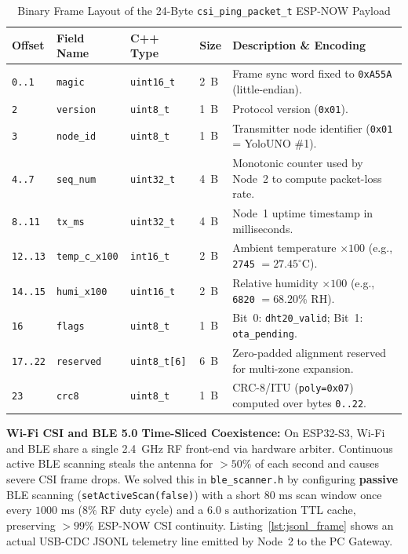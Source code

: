 \documentclass{hcmut-report}
\begin{document}
\begin{table}[H]
\centering
\caption{Binary Frame Layout of the 24-Byte \texttt{csi\_ping\_packet\_t} ESP-NOW Payload}
\label{tab:packet_layout}
\footnotesize
\begin{tabularx}{\textwidth}{|C{1.5cm}|P{2.8cm}|P{2.2cm}|C{1.3cm}|Y|}
\hline
\textbf{Offset} & \textbf{Field Name} & \textbf{C++ Type} & \textbf{Size} & \textbf{Description \& Encoding} \\
\hline
\texttt{0..1} & \texttt{magic} & \texttt{uint16\_t} & 2~B & Frame sync word fixed to \texttt{0xA55A} (little-endian). \\
\hline
\texttt{2} & \texttt{version} & \texttt{uint8\_t} & 1~B & Protocol version (\texttt{0x01}). \\
\hline
\texttt{3} & \texttt{node\_id} & \texttt{uint8\_t} & 1~B & Transmitter node identifier (\texttt{0x01} = YoloUNO \#1). \\
\hline
\texttt{4..7} & \texttt{seq\_num} & \texttt{uint32\_t} & 4~B & Monotonic counter used by Node~2 to compute packet-loss rate. \\
\hline
\texttt{8..11} & \texttt{tx\_ms} & \texttt{uint32\_t} & 4~B & Node~1 uptime timestamp in milliseconds. \\
\hline
\texttt{12..13} & \texttt{temp\_c\_x100} & \texttt{int16\_t} & 2~B & Ambient temperature $\times 100$ (e.g., \texttt{2745} $= 27.45^\circ$C). \\
\hline
\texttt{14..15} & \texttt{humi\_x100} & \texttt{uint16\_t} & 2~B & Relative humidity $\times 100$ (e.g., \texttt{6820} $= 68.20\%$ RH). \\
\hline
\texttt{16} & \texttt{flags} & \texttt{uint8\_t} & 1~B & Bit~0: \texttt{dht20\_valid}; Bit~1: \texttt{ota\_pending}. \\
\hline
\texttt{17..22} & \texttt{reserved} & \texttt{uint8\_t[6]} & 6~B & Zero-padded alignment reserved for multi-zone expansion. \\
\hline
\texttt{23} & \texttt{crc8} & \texttt{uint8\_t} & 1~B & CRC-8/ITU (\texttt{poly=0x07}) computed over bytes \texttt{0..22}. \\
\hline
\end{tabularx}
\end{table}

\textbf{Wi-Fi CSI and BLE 5.0 Time-Sliced Coexistence:} On ESP32-S3, Wi-Fi and BLE share a single 2.4~GHz RF front-end via hardware arbiter. Continuous active BLE scanning steals the antenna for $>50\%$ of each second and causes severe CSI frame drops. We solved this in \texttt{ble\_scanner.h} by configuring \textbf{passive} BLE scanning (\texttt{setActiveScan(false)}) with a short $80\text{ ms}$ scan window once every $1000\text{ ms}$ ($8\%$ RF duty cycle) and a $6.0\text{ s}$ authorization TTL cache, preserving $>99\%$ ESP-NOW CSI continuity. Listing~\ref{lst:jsonl_frame} shows an actual USB-CDC JSONL telemetry line emitted by Node~2 to the PC Gateway.
\end{document}
